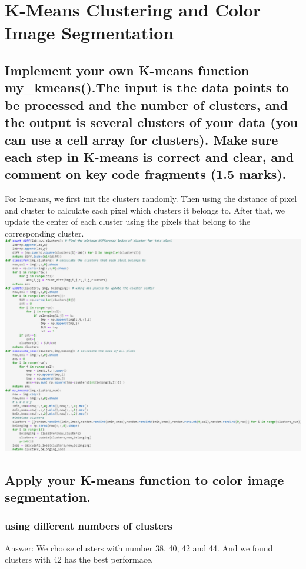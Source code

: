 \documentclass[]{article}
\begin{document}
\section{K-Means Clustering and Color Image Segmentation}
\subsection{Implement your own K-means function my\_kmeans().The input is the data points to be processed and the number of clusters, and the output is several clusters of your data (you can use a cell array for clusters). Make sure each step in K-means is correct and clear, and comment on key code fragments (1.5 marks).}
For k-means, we first init the clusters randomly. Then using the distance of pixel and cluster to calculate each pixel which clusters it belongs to. After that, we update the center of each cluster using the pixels that belong to the corresponding cluster.\\
\includegraphics[width=15cm]{code.png}
\subsection{Apply your K-means function to color image segmentation.}
\subsubsection{using different numbers of clusters}
Answer: We choose clusters with number 38, 40, 42 and 44. And we found clusters with 42 has the best performace.\\
\end{document}
